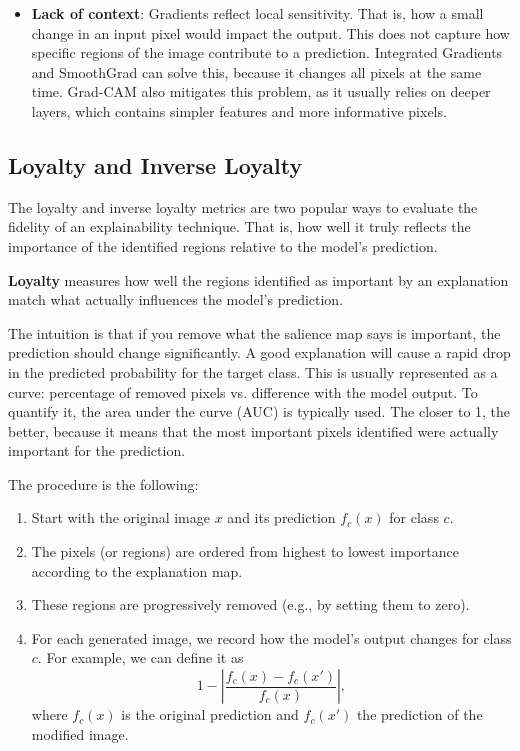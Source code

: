 \begin{itemize}
\item \textbf{Lack of context}: Gradients reflect local sensitivity. That is, how a small change in an input pixel would impact the output. This does not capture how specific regions of the image contribute to a prediction. Integrated Gradients and SmoothGrad can solve this, because it changes all pixels at the same time. Grad-CAM also mitigates this problem, as it usually relies on deeper layers, which contains simpler features and more informative pixels.
\end{itemize}

\subsection{Loyalty and Inverse Loyalty}

The loyalty and inverse loyalty metrics are two popular ways to evaluate the fidelity of an explainability technique. That is, how well it truly reflects the importance of the identified regions relative to the model's prediction.

\textbf{Loyalty} measures how well the regions identified as important by an explanation match what actually influences the model's prediction.

The intuition is that if you remove what the salience map says is important, the prediction should change significantly. A good explanation will cause a rapid drop in the predicted probability for the target class. This is usually represented as a curve: percentage of removed pixels vs. difference with the model output. To quantify it, the area under the curve (AUC) is typically used. The closer to 1, the better, because it means that the most important pixels identified were actually important for the prediction.

The procedure is the following:
\begin{enumerate}
\item Start with the original image $x$ and its prediction $f_c(x)$ for class $c$.

\item The pixels (or regions) are ordered from highest to lowest importance according to the explanation map.

\item These regions are progressively removed (e.g., by setting them to zero).

\item For each generated image, we record how the model's output changes for class $c$. For example, we can define it as
$$1-\left|\dfrac{f_c(x)-f_c(x')}{f_c(x)}\right|,$$
where $f_c(x)$ is the original prediction and $f_c(x')$ the prediction of the modified image.
\end{enumerate}

